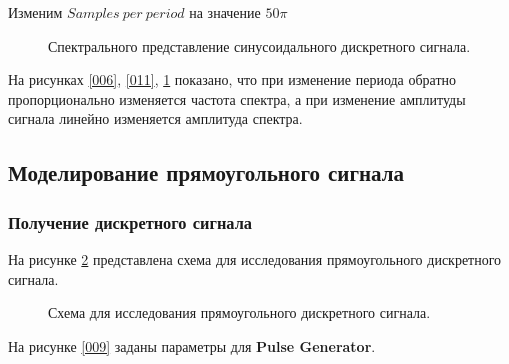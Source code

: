 \documentclass[a4paper,14pt]{extarticle}
\begin{document}
Изменим $Samples \ per \ period$ на значение $50\pi$

\begin{figure}[H]
\caption{Спектрального представление синусоидального дискретного сигнала.}
\label{012}
\end{figure}

На рисунках \ref{006}, \ref{011}, \ref{012} показано, что при изменение периода обратно пропорционально изменяется частота спектра, а при изменение амплитуды сигнала линейно изменяется амплитуда спектра.

\subsection{Моделирование прямоугольного сигнала}

\subsubsection{Получение дискретного сигнала}

На рисунке \ref{013} представлена схема для исследования прямоугольного дискретного сигнала.

\begin{figure}[H]
\caption{Схема для исследования прямоугольного дискретного сигнала.}
\label{013}
\end{figure}

На рисунке \ref{009} заданы параметры для \textbf{Pulse Generator}.
\end{document}
